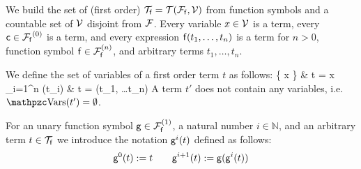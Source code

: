 
\begin{definition}\label{def:terms}
	We build the set of (first order) \( \mcTf = \mcTFfV \)
	from function symbols and a
	countable set of \( \mcV \) disjoint from \( \mcF \)\!.
	Every variable \( x\in\mcV \) is a term,
	every  \( \mc\in\mcFf^{(0)} \) is a term,
	and every expression \( \mf(t_1,\ldots,t_n) \) is a term
	for \( n>0 \), function symbol \( \mf\in\mcFfn \),
	and arbitrary terms \( t_1,\ldots,t_n \).
\end{definition}

\begin{definition}\label{def:term:vars}\label{def:term:ground}
	We define the set of variables of a first order term \( t \) as follows:
	 {
		\{ x \} &  t = x \in \mcV \\
		\bigcup_{i=1}^n \var(t_i) &   t = \mf(t_1, \ldots t_n)
	}
	A  term \( t' \) does not contain any variables, i.e.~\( \var(t') = \emptyset \).
\end{definition}

\begin{definition}\label{def:unary:power}
	For an unary function symbol \( \mg\in\mcFfn[1] \), a natural number
	\( i\in\mathbb{N} \), and an arbitrary term \( t\in\mcTf \) we introduce the notation \( \mg^i(t) \) defined as follows:
	\[
	\mg^0(t) := t \qquad
	\mg^{i+1}(t) := \mg(\mg^i(t))
	\]
\end{definition}

